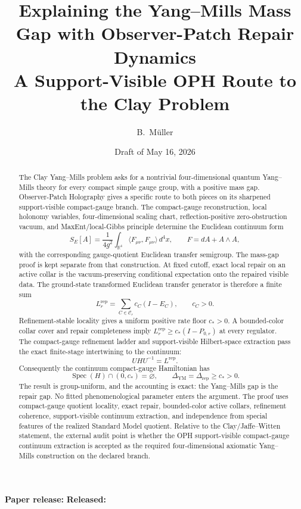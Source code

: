 \documentclass[11pt]{article}
\title{\textbf{Explaining the Yang--Mills Mass Gap with Observer-Patch Repair Dynamics}\\
\large A Support-Visible OPH Route to the Clay Problem}
\author{B.\ M\"uller}
\date{Draft of May 16, 2026}
\numberwithin{equation}{section}
\theoremstyle{remark}
\newcommand{\YM}{\mathrm{YM}}
\newcommand{\Rep}{\mathrm{rep}}
\begin{document}
\maketitle
\begin{center}
\small\textbf{Paper release:} \OPHPaperReleaseID\quad
\textbf{Released:} \OPHPaperReleaseDate
\end{center}

\begin{abstract}
The Clay Yang--Mills problem asks for a nontrivial four-dimensional quantum Yang--Mills theory
for every compact simple gauge group, with a positive mass gap. Observer-Patch Holography gives a
specific route to both pieces on its sharpened support-visible compact-gauge branch. The
compact-gauge reconstruction, local holonomy variables, four-dimensional scaling chart,
reflection-positive zero-obstruction vacuum, and MaxEnt/local-Gibbs principle determine the
Euclidean continuum form
\[
S_E[A]=\frac{1}{4g^2}\int_{\mathbb R^4}
\langle F_{\mu\nu},F_{\mu\nu}\rangle\,d^4x,
\qquad F=dA+A\wedge A,
\]
with the corresponding gauge-quotient Euclidean transfer semigroup. The mass-gap proof is
kept separate from that construction. At fixed cutoff, exact local repair on an active collar is the
vacuum-preserving conditional expectation onto the repaired visible data. The ground-state
transformed Euclidean transfer generator is therefore a finite sum
\[
L_r^{\Rep}=\sum_{C\in\mathcal C_r} c_C(I-E_C),
\qquad c_C>0.
\]
Refinement-stable locality gives a uniform positive rate floor \(c_*>0\). A bounded-color collar
cover and repair completeness imply \(L_r^{\Rep}\ge c_*(I-P_{0,r})\) at every regulator. The
compact-gauge refinement ladder and support-visible Hilbert-space extraction pass the exact
finite-stage intertwining to the continuum:
\[
UHU^{-1}=L^{\mathrm{rep}}.
\]
Consequently the continuum compact-gauge Hamiltonian has
\[
\operatorname{Spec}(H)\cap(0,c_*)=\varnothing,
\qquad
\Delta_{\YM}=\Delta_{\mathrm{rep}}\ge c_*>0.
\]
The result is group-uniform, and the accounting is exact: the Yang--Mills gap is the repair gap.
No fitted phenomenological parameter enters the argument. The proof uses compact-gauge quotient locality, exact repair,
bounded-color active collars, refinement coherence, support-visible continuum extraction, and
independence from special features of the realized Standard Model quotient. Relative to the Clay/Jaffe--Witten
statement, the external audit point is whether the OPH support-visible compact-gauge
continuum extraction is accepted as the required four-dimensional axiomatic Yang--Mills
construction on the declared branch.
\end{abstract}
\end{document}
